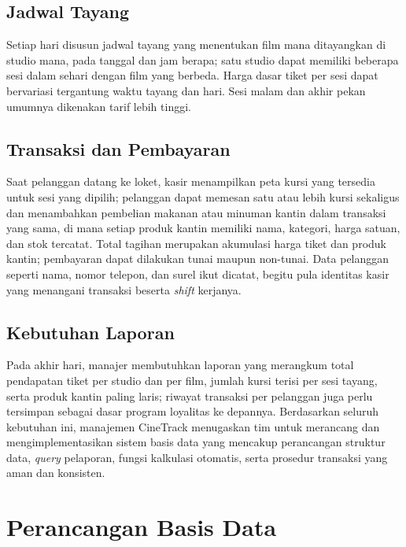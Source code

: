 \documentclass[letter,12pt,bahasa]{article}
\begin{document}
\subsection{Jadwal Tayang}

Setiap hari disusun jadwal tayang yang menentukan film mana ditayangkan di studio mana, pada tanggal dan jam berapa; satu studio dapat memiliki beberapa sesi dalam sehari dengan film yang berbeda. Harga dasar tiket per sesi dapat bervariasi tergantung waktu tayang dan hari. Sesi malam dan akhir pekan umumnya dikenakan tarif lebih tinggi.

\subsection{Transaksi dan Pembayaran}

Saat pelanggan datang ke loket, kasir menampilkan peta kursi yang tersedia untuk sesi yang dipilih; pelanggan dapat memesan satu atau lebih kursi sekaligus dan menambahkan pembelian makanan atau minuman kantin dalam transaksi yang sama, di mana setiap produk kantin memiliki nama, kategori, harga satuan, dan stok tercatat. Total tagihan merupakan akumulasi harga tiket dan produk kantin; pembayaran dapat dilakukan tunai maupun non-tunai. Data pelanggan seperti nama, nomor telepon, dan surel ikut dicatat, begitu pula identitas kasir yang menangani transaksi beserta \textit{shift} kerjanya.

\subsection{Kebutuhan Laporan}

Pada akhir hari, manajer membutuhkan laporan yang merangkum total pendapatan tiket per studio dan per film, jumlah kursi terisi per sesi tayang, serta produk kantin paling laris; riwayat transaksi per pelanggan juga perlu tersimpan sebagai dasar program loyalitas ke depannya. Berdasarkan seluruh kebutuhan ini, manajemen CineTrack menugaskan tim untuk merancang dan mengimplementasikan sistem basis data yang mencakup perancangan struktur data, \textit{query} pelaporan, fungsi kalkulasi otomatis, serta prosedur transaksi yang aman dan konsisten.

\clearpage

\section{Perancangan Basis Data}
\end{document}
